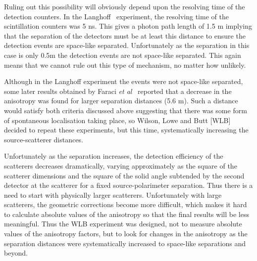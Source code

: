 \documentclass[11pt]{article}
\begin{document}
Ruling out this possibility will obviously depend upon the resolving time of the detection counters. In the Langhoff~\cite{hl60} experiment, the resolving time of the scintillation counters was 5 ns. This gives a photon path length of 1.5 m implying that the separation of the detectors must be at least this distance to ensure the detection events are space-like separated.  Unfortunately as the separation in this case is only 0.5m the detection events are not space-like separated.  This again means that we cannot rule out this type of mechanism, no matter how unlikely.

Although in the  Langhoff experiment the  events were not space-like separated, some later results  obtained by Faraci {\em et al}~\cite{dfdg74} 
 reported that a  decrease in the anisotropy was found for  larger separation distances (5.6 m). Such a distance would satisfy both criteria discussed above    suggesting that there was some form of spontaneous localisation taking place, so Wilson, Lowe and Butt [WLB]~\cite{awjldb67}
 decided to repeat these experiments, but this time, systematically increasing the source-scatterer distances.  
 
Unfortunately as the separation increases, the detection efficiency of the scatterers decreases dramatically, varying approximately as the square of the scatterer dimensions and the square of the solid angle subtended by the second detector at the scatterer for a fixed source-polarimeter separation.  Thus there is a need to start with physically larger scatterers.
 Unfortunately with large scatterers, the geometric corrections become more difficult, which makes it hard to calculate absolute values of the anisotropy so that the final results will be less meaningful. Thus the WLB experiment was designed, not to measure absolute values of the anisotropy factors, but to look for changes in the anisotropy as the separation distances were systematically increased to space-like separations and  beyond.
 
\end{document}
